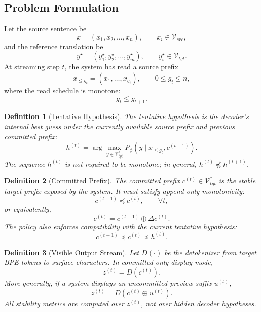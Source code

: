 \documentclass[conference]{IEEEtran}
\newtheorem{mydef}{Definition}[section]
\begin{document}
\subsection{Problem Formulation}
Let the source sentence be
\begin{equation}
    x=(x_1,x_2,\ldots,x_n), \qquad x_i \in \mathcal{V}_{src},
\end{equation}
and the reference translation be
\begin{equation}
    y^\star=(y^\star_1,y^\star_2,\ldots,y^\star_m), \qquad y^\star_i \in \mathcal{V}_{tgt}.
\end{equation}
At streaming step $t$, the system has read a source prefix
\begin{equation}
    x_{\le g_t}=(x_1,\ldots,x_{g_t}), \qquad 0\le g_t\le n,
\end{equation}
where the read schedule is monotone:
\begin{equation}
    g_t \le g_{t+1}.
\end{equation}

\begin{mydef}[Tentative Hypothesis]
The tentative hypothesis is the decoder's internal best guess under the currently available source prefix and previous committed prefix:
\begin{equation}
    h^{(t)}=\arg\max_{y\in \mathcal{V}_{tgt}^{\ast}} P_{\phi}\left(y\mid x_{\le g_t},c^{(t-1)}\right).
\end{equation}
The sequence $h^{(t)}$ is not required to be monotone; in general, $h^{(t)}\not\preceq h^{(t+1)}$.
\end{mydef}

\begin{mydef}[Committed Prefix]
The committed prefix $c^{(t)}\in\mathcal{V}_{tgt}^{\ast}$ is the stable target prefix exposed by the system. It must satisfy append-only monotonicity:
\begin{equation}
    c^{(t-1)}\preceq c^{(t)}, \qquad \forall t,
\end{equation}
or equivalently,
\begin{equation}
    c^{(t)}=c^{(t-1)}\oplus \Delta c^{(t)}.
\end{equation}
The policy also enforces compatibility with the current tentative hypothesis:
\begin{equation}
    c^{(t-1)} \preceq c^{(t)} \preceq h^{(t)}.
\end{equation}
\end{mydef}

\begin{mydef}[Visible Output Stream]
Let $D(\cdot)$ be the detokenizer from target BPE tokens to surface characters. In committed-only display mode,
\begin{equation}
    z^{(t)}=D(c^{(t)}).
\end{equation}
More generally, if a system displays an uncommitted preview suffix $u^{(t)}$,
\begin{equation}
    z^{(t)}=D\left(c^{(t)}\oplus u^{(t)}\right).
\end{equation}
All stability metrics are computed over $z^{(t)}$, not over hidden decoder hypotheses.
\end{mydef}
\end{document}
